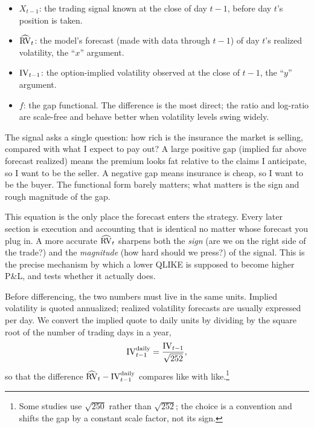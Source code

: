 \begin{itemize}
  \item $X_{t-1}$: the trading signal known at the close of day $t-1$, before day $t$'s position is taken.
  \item $\widehat{\operatorname{RV}}_t$: the model's forecast (made with data through $t-1$) of day $t$'s realized volatility, the ``$x$'' argument.
  \item $\operatorname{IV}_{t-1}$: the option-implied volatility observed at the close of $t-1$, the ``$y$'' argument.
  \item $f$: the gap functional. The difference is the most direct; the ratio and log-ratio are scale-free and behave better when volatility levels swing widely.
\end{itemize}

\begin{intuition}
The signal asks a single question: how rich is the insurance the market is selling, compared with what I expect to pay out? A large positive gap (implied far above forecast realized) means the premium looks fat relative to the claims I anticipate, so I want to be the seller. A negative gap means insurance is cheap, so I want to be the buyer. The functional form barely matters; what matters is the sign and rough magnitude of the gap.
\end{intuition}

\begin{projectconnection}
This equation is the only place the forecast enters the strategy. Every later section is execution and accounting that is identical no matter whose forecast you plug in. A more accurate $\widehat{\operatorname{RV}}_t$ sharpens both the \emph{sign} (are we on the right side of the trade?) and the \emph{magnitude} (how hard should we press?) of the signal. This is the precise mechanism by which a lower QLIKE is supposed to become higher P\&L, and  tests whether it actually does.
\end{projectconnection}

Before differencing, the two numbers must live in the same units. Implied volatility is quoted annualized; realized volatility forecasts are usually expressed per day. We convert the implied quote to daily units by dividing by the square root of the number of trading days in a year,
\begin{equation}
\label{eq:ivrv:deannualize}
\operatorname{IV}^{\text{daily}}_{t-1} = \frac{\operatorname{IV}_{t-1}}{\sqrt{252}},
\end{equation}
so that the difference $\widehat{\operatorname{RV}}_t - \operatorname{IV}^{\text{daily}}_{t-1}$ compares like with like.\footnote{Some studies use $\sqrt{250}$ rather than $\sqrt{252}$; the choice is a convention and shifts the gap by a constant scale factor, not its sign.}

